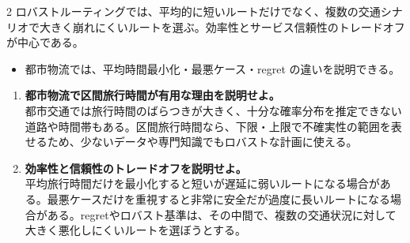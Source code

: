 \begin{multicols}{2}
ロバストルーティングでは、平均的に短いルートだけでなく、複数の交通シナリオで大きく崩れにくいルートを選ぶ。効率性とサービス信頼性のトレードオフが中心である。\par
{}
\begin{itemize}
\item 都市物流では、平均時間最小化・最悪ケース・regret の違いを説明できる。
\end{itemize}
\begin{enumerate}
\item \textbf{都市物流で区間旅行時間が有用な理由を説明せよ。}\\都市交通では旅行時間のばらつきが大きく、十分な確率分布を推定できない道路や時間帯もある。区間旅行時間なら、下限・上限で不確実性の範囲を表せるため、少ないデータや専門知識でもロバストな計画に使える。
\item \textbf{効率性と信頼性のトレードオフを説明せよ。}\\平均旅行時間だけを最小化すると短いが遅延に弱いルートになる場合がある。最悪ケースだけを重視すると非常に安全だが過度に長いルートになる場合がある。regretやロバスト基準は、その中間で、複数の交通状況に対して大きく悪化しにくいルートを選ぼうとする。
\end{enumerate}
\end{multicols}

